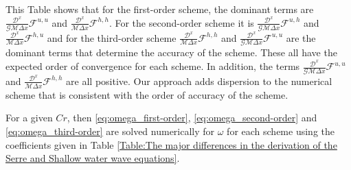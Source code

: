 \documentclass[preprint,sort&compress,1p]{article}
\begin{document}
This Table shows that for the first-order scheme, the dominant terms are $\frac{\mathcal{D}^x}{\mathcal{G}\mathcal{M}\Delta x}\mathcal{F}^{u,u}$ and $\frac{\mathcal{D}^x}{\mathcal{M}\Delta x}\mathcal{F}^{h,h}$. For the second-order scheme it is $\frac{\mathcal{D}^x}{\mathcal{G}\mathcal{M}\Delta x}\mathcal{F}^{u,h}$  and $\frac{\mathcal{D}^x}{\mathcal{M}\Delta x}\mathcal{F}^{h,u}$ and for the third-order scheme $\frac{\mathcal{D}^x}{\mathcal{M}\Delta x}\mathcal{F}^{h,h}$ and $\frac{\mathcal{D}^x}{\mathcal{G}\mathcal{M}\Delta x}\mathcal{F}^{u,u}$ are the dominant terms that determine the accuracy of the scheme. These all have the expected order of convergence for each scheme. In addition, the terms $\frac{\mathcal{D}^x}{\mathcal{G}\mathcal{M}\Delta x}\mathcal{F}^{u,u}$ and $\frac{\mathcal{D}^x}{\mathcal{M}\Delta x}\mathcal{F}^{h,h}$ are all positive. Our approach adds dispersion to the numerical scheme that is consistent with the order of accuracy of the scheme.

For a given $Cr$, then \eqref{eq:omega_first-order}, \eqref{eq:omega_second-order} and \eqref{eq:omega_third-order} are solved numerically for $\omega$ for each scheme using the coefficients given in Table \ref{Table:The major differences in the derivation of the Serre and Shallow water wave equations}.
\end{document}
